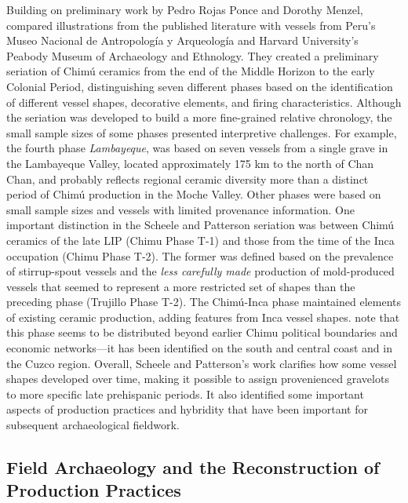 \documentclass[]{interact}
\theoremstyle{plain}%
\theoremstyle{definition}
\theoremstyle{remark}
\begin{document}
Building on preliminary work by Pedro Rojas Ponce and Dorothy Menzel,
\citet{RN11158} compared illustrations from the published literature
with vessels from Peru's Museo Nacional de Antropología y Arqueología
and Harvard University's Peabody Museum of Archaeology and Ethnology.
They created a preliminary seriation of Chimú ceramics from the end of
the Middle Horizon to the early Colonial Period, distinguishing seven
different phases based on the identification of different vessel shapes,
decorative elements, and firing characteristics. Although the seriation
was developed to build a more fine-grained relative chronology, the
small sample sizes of some phases presented interpretive challenges. For
example, the fourth phase \emph{Lambayeque}, was based on seven vessels
from a single grave in the Lambayeque Valley, located approximately 175
km to the north of Chan Chan, and probably reflects regional ceramic
diversity more than a distinct period of Chimú production in the Moche
Valley. Other phases were based on small sample sizes and vessels with
limited provenance information. One important distinction in the Scheele
and Patterson seriation was between Chimú ceramics of the late LIP
(Chimu Phase T-1) and those from the time of the Inca occupation (Chimu
Phase T-2). The former was defined based on the prevalence of
stirrup-spout vessels and the \emph{less carefully made} production of
mold-produced vessels that seemed to represent a more restricted set of
shapes than the preceding phase (Trujillo Phase T-2). The Chimú-Inca
phase maintained elements of existing ceramic production, adding
features from Inca vessel shapes. \citet[24]{RN11158} note that this
phase seems to be distributed beyond earlier Chimu political boundaries
and economic networks---it has been identified on the south and central
coast and in the Cuzco region. Overall, Scheele and Patterson's work
clarifies how some vessel shapes developed over time, making it possible
to assign provenienced gravelots to more specific late prehispanic
periods. It also identified some important aspects of production
practices and hybridity that have been important for subsequent
archaeological fieldwork.

\hypertarget{field-archaeology-and-the-reconstruction-of-production-practices}{%
\subsection{Field Archaeology and the Reconstruction of Production
Practices}\label{field-archaeology-and-the-reconstruction-of-production-practices}}
\end{document}
